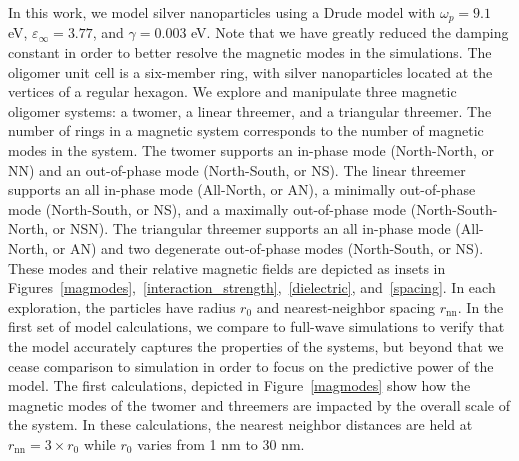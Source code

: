 \documentclass[journal=apchd5,manuscript=article]{achemso}
\begin{document}
In this work, we model silver nanoparticles using a Drude model with $\omega_p = 9.1$ eV, $\varepsilon_{\infty} = 3.77$, and $\gamma = 0.003$ eV. Note that we have greatly reduced the damping constant in order to better resolve the magnetic modes in the simulations. The oligomer unit cell is a six-member ring, with silver nanoparticles located at the vertices of a regular hexagon. We explore and manipulate three magnetic oligomer systems: a twomer, a linear threemer, and a triangular threemer. The number of rings in a magnetic system corresponds to the number of magnetic modes in the system\cite{Cherqui2014}. The twomer supports an in-phase mode (North-North, or NN) and an out-of-phase mode (North-South, or NS). The linear threemer supports an all in-phase mode (All-North, or AN), a minimally out-of-phase mode (North-South, or NS), and a maximally out-of-phase mode (North-South-North, or NSN). The triangular threemer supports an all in-phase mode (All-North, or AN) and two degenerate out-of-phase modes (North-South, or NS). These modes and their relative magnetic fields are depicted as insets in Figures~\ref{magmodes},~\ref{interaction_strength},~\ref{dielectric}, and~\ref{spacing}. In each exploration, the particles have radius $r_0$ and nearest-neighbor spacing $r_{\textrm{nn}}$. In the first set of model calculations, we compare to full-wave simulations to verify that the model accurately captures the properties of the systems, but beyond that we cease comparison to simulation in order to focus on the predictive power of the model. The first calculations, depicted in Figure~\ref{magmodes} show how the magnetic modes of the twomer and threemers are impacted by the overall scale of the system. In these calculations, the nearest neighbor distances are held at $r_{\textrm{nn}} = 3 \times r_0$ while $r_0$ varies from 1 nm to 30 nm.
\end{document}
